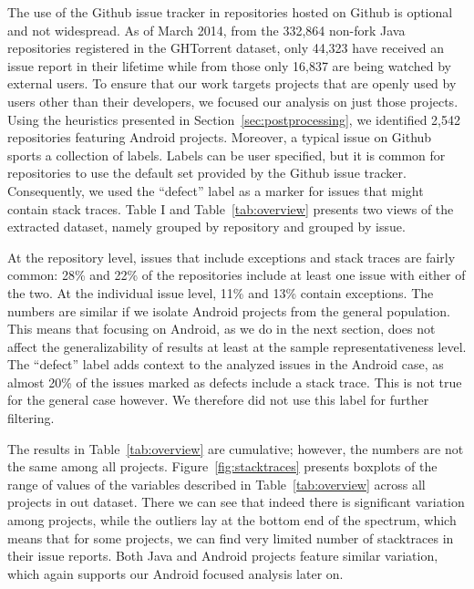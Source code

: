 \documentclass[conference]{IEEEtran}
\begin{document}

The use of the Github issue tracker in repositories hosted on Github is optional
and not widespread. 
As of March 2014, from the 332,864 non-fork Java repositories registered in the 
GHTorrent dataset, only 44,323 have received an issue report in their lifetime
while from those only 16,837 are being watched by external users.
To ensure that our work targets projects that are openly used by 
users other than their developers, we focused our analysis on just those
projects. Using the heuristics presented in Section~\ref{sec:postprocessing}, 
we identified 2,542 repositories featuring Android projects.
Moreover, a typical issue on Github sports a collection of labels. Labels
can be user specified, but it is common for repositories to use the default set
provided by the Github issue tracker. Consequently, we used the ``defect'' label
as a marker for issues that might contain stack traces.
Table I and Table~\ref{tab:overview} presents two views of the extracted dataset,
namely grouped by repository and grouped by issue.

At the repository level, issues that include exceptions and stack traces
are fairly common: 28\% and 22\% of the repositories include at least
one issue with either of the two. At the individual issue level, 
11\% and 13\% contain exceptions. The numbers are similar if we
isolate Android projects from the general population. This means
that focusing on Android, as we do in the next section, does not affect the 
generalizability of results at least at the sample representativeness  
level. The ``defect'' label adds context to the analyzed issues in the
Android case, as almost 20\% of the issues marked as defects include
a stack trace. This is not true for the general case however. We therefore
did not use this label for further filtering.

The results in Table~\ref{tab:overview} are cumulative; however, the numbers
are not the same among all projects. Figure~\ref{fig:stacktraces} 
presents boxplots of the range of values of the variables described in  
Table~\ref{tab:overview} across all projects in out dataset. 
There we can see that indeed there is significant variation among projects,
while the outliers lay at the bottom end of the spectrum, which means that for
some projects, we can find very limited number of stacktraces in their 
issue reports. Both Java and Android projects feature similar variation,
which again supports our Android focused analysis later on.
\end{document}
